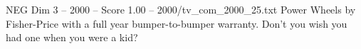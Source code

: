 \begin{textsample}{NEG Dim 3 – 2000 – Score 1.00 – 2000/tv\_com\_2000\_25.txt}  \label{ex:f3_neg_020}
Power Wheels by Fisher-Price with a full year bumper-to-bumper warranty.
Don't you wish you had one when you were a kid?

\end{textsample}
